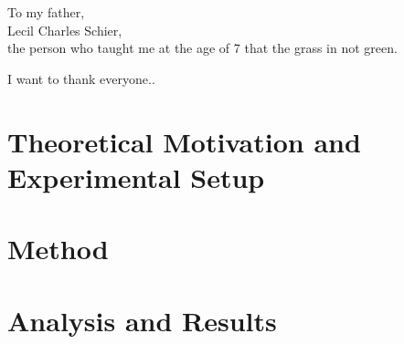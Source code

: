 \documentclass[11pt]{ucthesis}
\begin{document}
\begin{frontmatter}
\begin{dedication}
\null\vfil
{\large
\begin{center}
To my father,\\\vspace{12pt}
Lecil Charles Schier,\\\vspace{12pt}
the person who taught me at the age of 7 that the grass in not green.
\end{center}}
\vfil\null
\end{dedication}


\begin{acknowledgements}
I want to thank everyone..
\end{acknowledgements}

\end{frontmatter}

\part{Theoretical Motivation and Experimental Setup}


\part{Method}






\part{Analysis and Results}






\nocite{*}



\appendix

\iffalse


Ancillary material should be put in appendices, which appear after the
bibliography. 
\fi
\end{document}
